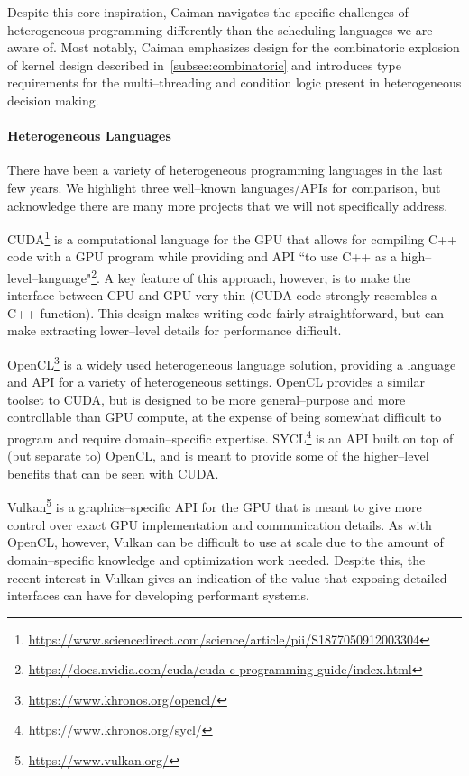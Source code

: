 Despite this core inspiration, Caiman navigates the specific challenges of heterogeneous programming differently than the scheduling languages we are aware of.   Most notably, Caiman emphasizes design for the combinatoric explosion of kernel design described in~\ref{subsec:combinatoric} and introduces type requirements for the multi--threading and condition logic present in heterogeneous decision making.

\paragraph{Heterogeneous Languages}

There have been a variety of heterogeneous programming languages in the last few years.  We highlight three well--known languages/APIs for comparison, but acknowledge there are many more projects that we will not specifically address.

CUDA\footnote{\url{https://www.sciencedirect.com/science/article/pii/S1877050912003304}} is a computational language for the GPU that allows for compiling C++ code with a GPU program while providing and API ``to use C++ as a high--level--language"\footnote{\url{https://docs.nvidia.com/cuda/cuda-c-programming-guide/index.html}}.  A key feature of this approach, however, is to make the interface between CPU and GPU very thin (CUDA code strongly resembles a C++ function).  This design makes writing code fairly straightforward, but can make extracting lower--level details for performance difficult.

OpenCL\footnote{\url{https://www.khronos.org/opencl/}} is a widely used heterogeneous language solution, providing a language and API for a variety of heterogeneous settings.  OpenCL provides a similar toolset to CUDA, but is designed to be more general--purpose and more controllable than GPU compute, at the expense of being somewhat difficult to program and require domain--specific expertise.  SYCL\footnote{https://www.khronos.org/sycl/} is an API built on top of (but separate to) OpenCL, and is meant to provide some of the higher--level benefits that can be seen with CUDA.

Vulkan\footnote{\url{https://www.vulkan.org/}} is a graphics--specific API for the GPU that is meant to give more control over exact GPU implementation and communication details.  As with OpenCL, however, Vulkan can be difficult to use at scale due to the amount of domain--specific knowledge and optimization work needed.  Despite this, the recent interest in Vulkan gives an indication of the value that exposing detailed interfaces can have for developing performant systems.

